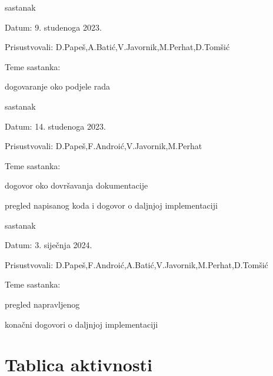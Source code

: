 \begin{packed_enum}
			\item  sastanak
			\item[] \begin{packed_item}
				\item Datum: 9. studenoga 2023.
				\item Prisustvovali: D.Papeš,A.Batić,V.Javornik,M.Perhat,D.Tomšić
				\item Teme sastanka:
				\begin{packed_item}
					\item dogovaranje oko podjele rada
				\end{packed_item}
			\end{packed_item}			
			
			\item  sastanak
			\item[] \begin{packed_item}
				\item Datum: 14. studenoga 2023.
				\item Prisustvovali: D.Papeš,F.Androić,V.Javornik,M.Perhat
				\item Teme sastanka:
				\begin{packed_item}
					\item dogovor oko dovršavanja dokumentacije
					\item pregled napisanog koda i dogovor o daljnjoj implementaciji
				\end{packed_item}
			\end{packed_item}	
			
			\item  sastanak
			\item[] \begin{packed_item}
				\item Datum: 3. siječnja 2024.
				\item Prisustvovali: D.Papeš,F.Androić,A.Batić,V.Javornik,M.Perhat,D.Tomšić
				\item Teme sastanka:
				\begin{packed_item}
					\item pregled napravljenog
					\item konačni dogovori o daljnjoj implementaciji
				\end{packed_item}
			\end{packed_item}	
			
			
		\end{packed_enum}
		
		\eject
		\section*{Tablica aktivnosti}

